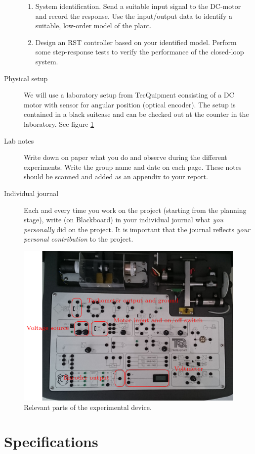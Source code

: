 \documentclass[a4paper]{scrartcl}
\begin{document}
\begin{description}
\begin{enumerate}
\item System identification. Send a suitable input signal to the DC-motor and record the response. Use the input/output data to identify a suitable, low-order model of the plant.
\item Design an RST controller based on your identified model. Perform some step-response tests to verify the performance of the closed-loop system.
\end{enumerate}
\item[{Physical setup}] We will use a laboratory setup from TecQuipment consisting of a DC motor with sensor for angular position (optical encoder). The setup is contained in a black suitcase and can be checked out at the counter in the laboratory. See figure \ref{fig:equipment}
\item[{Lab notes}] Write down on paper what you do and observe during the different experiments. Write the group name and date on each page. These notes should be scanned and added as an appendix to your report.
\item[{Individual journal}] Each and every time you work on the project (starting from the planning stage), write (on Blackboard) in your individual journal what \emph{you personally} did on the project. It is important that the journal reflects \emph{your personal contribution} to the project.
\end{description}

\begin{figure}
\begin{center}
\includegraphics[width=0.7\linewidth]{figures/overview}
\caption{Relevant parts of the experimental device.}
\label{fig:equipment}
\end{center}
\end{figure}

\section*{Specifications}
\label{sec-2}
\end{document}
